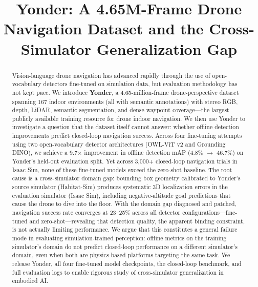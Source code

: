\documentclass[conference]{IEEEtran}
\begin{document}
\title{Yonder: A 4.65M-Frame Drone Navigation Dataset and the Cross-Simulator Generalization Gap}

\author{
}

\maketitle

\begin{abstract}
Vision-language drone navigation has advanced rapidly through the use of open-vocabulary detectors fine-tuned on simulation data, but evaluation methodology has not kept pace. We introduce \textbf{Yonder}, a 4.65-million-frame drone-perspective dataset spanning 167 indoor environments (all with semantic annotations) with stereo RGB, depth, LiDAR, semantic segmentation, and dense waypoint coverage---the largest publicly available training resource for drone indoor navigation. We then use Yonder to investigate a question that the dataset itself cannot answer: whether offline detection improvements predict closed-loop navigation success. Across four fine-tuning attempts using two open-vocabulary detector architectures (OWL-ViT v2 and Grounding DINO), we achieve a 9.7$\times$ improvement in offline detection mAP (4.8\% $\rightarrow$ 46.7\%) on Yonder's held-out evaluation split. Yet across 3,000+ closed-loop navigation trials in Isaac Sim, none of these fine-tuned models exceed the zero-shot baseline. The root cause is a cross-simulator domain gap: bounding box geometry calibrated to Yonder's source simulator (Habitat-Sim) produces systematic 3D localization errors in the evaluation simulator (Isaac Sim), including negative-altitude goal predictions that cause the drone to dive into the floor. With the domain gap diagnosed and patched, navigation success rate converges at 23--25\% across all detector configurations---fine-tuned and zero-shot---revealing that detection quality, the apparent binding constraint, is not actually limiting performance. We argue that this constitutes a general failure mode in evaluating simulation-trained perception: offline metrics on the training simulator's domain do not predict closed-loop performance on a different simulator's domain, even when both are physics-based platforms targeting the same task. We release Yonder, all four fine-tuned model checkpoints, the closed-loop benchmark, and full evaluation logs to enable rigorous study of cross-simulator generalization in embodied AI.
\end{abstract}
\end{document}
